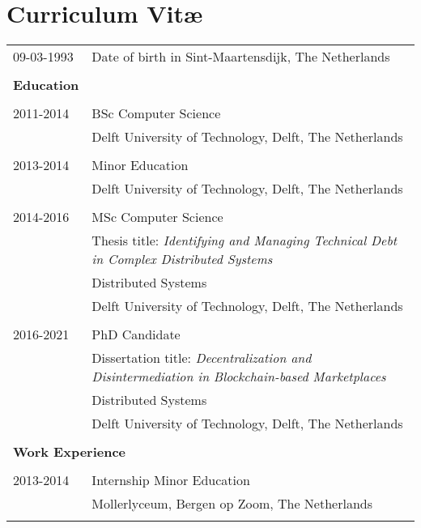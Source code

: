 \chapter*{Curriculum Vit\ae}

\makeatletter
\authors{\@firstname\ {\titleshape\@lastname}}
\makeatother

\noindent
\begin{longtable}{p{} p{}}
    09-03-1993	 & Date of birth in Sint-Maartensdijk, The Netherlands \\\\
    
    \large{\textbf{Education}} & \\\\
    2011-2014 & BSc Computer Science\\
    & Delft University of Technology, Delft, The Netherlands \\\\
    
    2013-2014 & Minor Education\\
    & Delft University of Technology, Delft, The Netherlands\\\\
    
    2014-2016 & MSc Computer Science\\
    & Thesis title: \emph{Identifying and Managing Technical Debt in Complex Distributed Systems}\\
    & Distributed Systems\\
    & Delft University of Technology, Delft, The Netherlands\\\\
    
    2016-2021 & PhD Candidate\\
    & Dissertation title: \emph{Decentralization and Disintermediation in Blockchain-based Marketplaces}\\
    & Distributed Systems\\
    & Delft University of Technology, Delft, The Netherlands\\\\
    
    \multicolumn{2}{l}{\large{\textbf{Work Experience}}}\\\\
    
    2013-2014 & Internship Minor Education\\
    & Mollerlyceum, Bergen op Zoom, The Netherlands\\\\
    

\end{longtable}
